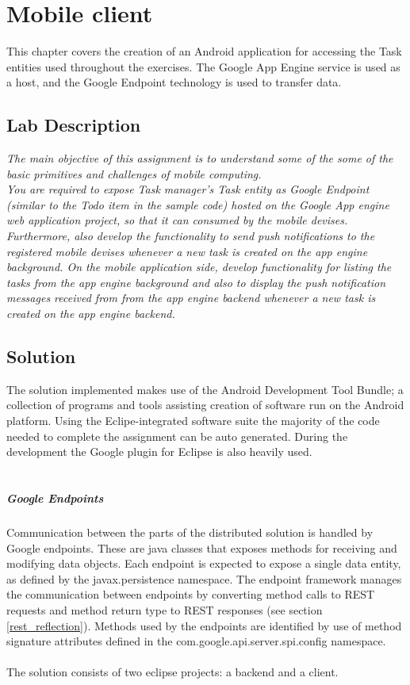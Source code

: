 \chapter{Mobile client}
\minitoc
This chapter covers the creation of an Android application for accessing the Task entities used throughout the exercises. The Google App Engine service is used as a host, and the Google Endpoint technology is used to transfer data.

\section{Lab Description}

\textit{The main objective of this assignment is to understand some of the some of the basic primitives and challenges of mobile computing.\\
You are required to expose Task manager’s Task entity as Google Endpoint (similar to the Todo item in the sample code) hosted on the Google App engine web application project, so that it can consumed by the mobile devises. Furthermore, also develop the functionality to send push notifications to the registered mobile devises whenever a new task is created on the app engine background. On the mobile application side, develop functionality for listing the tasks from the app engine background and also to display the push notification messages received from from the app engine backend whenever a new task is created on the app engine backend.}

\section{Solution}
The solution implemented makes use of the Android Development Tool Bundle; a collection of programs and tools assisting creation of software run on the Android platform. Using the Eclipe-integrated software suite the majority of the code needed to complete the assignment can be auto generated. During the development the Google plugin for Eclipse is also heavily used.\\\\
\paragraph{Google Endpoints} Communication between the parts of the distributed solution is handled by Google endpoints. These are java classes that exposes methods for receiving and modifying data objects. Each endpoint is expected to expose a single data entity, as defined by the javax.persistence namespace. The endpoint framework manages the communication between endpoints by converting method calls to REST requests and method return type to REST responses (see section \ref{rest_reflection}). Methods used by the endpoints are identified by use of method signature attributes defined in the com.google.api.server.spi.config namespace.\\\\
The solution consists of two eclipse projects: a backend and a client.\\
